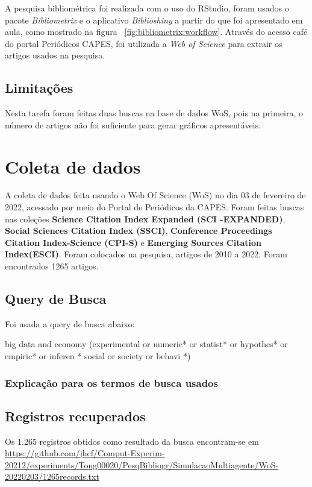 A pesquisa bibliométrica foi realizada com o uso do RStudio, foram usados o pacote \textit{Bibliometrix} e o aplicativo \textit{Biblioshiny} a partir do que foi apresentado em aula, como mostrado na figura ~\ref{fig:bibliometrix:workflow}. Através do acesso café do portal Periódicos CAPES, foi utilizada a \textit{Web of Science} para extrair os artigos usados na pesquisa.


\subsection{Limitações} 

Nesta tarefa foram feitas duas buscas na base de dados WoS, pois na primeira, o número de artigos não foi suficiente para gerar gráficos apresentáveis.


\section{Coleta de dados}

A coleta de dados feita usando o Web Of Science (WoS) no dia 03 de fevereiro de 2022, acessado por meio do Portal de Periódicos da CAPES. Foram feitas buscas nas coleções \textbf{Science  Citation  Index  Expanded (SCI -EXPANDED)}, \textbf{Social Sciences  Citation  Index (SSCI)}, \textbf{Conference Proceedings Citation Index-Science (CPI-S)} e \textbf{Emerging Sources Citation Index(ESCI)}. Foram colocados na pesquisa, artigos de 2010 a 2022. Foram encontrados 1265 artigos.

\subsection{Query de Busca}

Foi usada a query de busca abaixo: 

big data and economy (experimental  or  numeric* or  statist* or  hypothes* or  empiric* or  inferen * social  or  society  or  behavi *)

\subsubsection{Explicação para os termos de busca usados}


\subsection{Registros recuperados}

Os 1.265 registros obtidos como resultado da busca encontram-se em \url{https://github.com/jhcf/Comput-Experim-20212/experiments/Tong00020/PesqBibliogr/SimulacaoMultiagente/WoS-20220203/1265records.txt}

